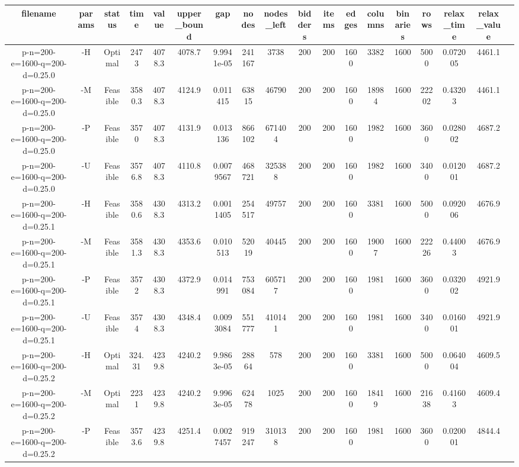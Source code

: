 \documentclass[landscape, a4paper]{article}
\begin{document}
\begin{center}
\begin{tabular}{@{}cccccccccccccccccc@{}}
filename & params & status & time & value & upper\_bound & gap & nodes & nodes\_left & bidders & items & edges & columns & binaries & rows & relax\_time & relax\_value & \\
\hline
p-n=200-e=1600-q=200-d=0.25.0 & -H & Optimal & 2473 & 4078.3 & 4078.7 & 9.9941e-05 & 241167 & 3738 & 200 & 200 & 1600 & 3382 & 1600 & 5000 & 0.072005 & 4461.1 & \\
p-n=200-e=1600-q=200-d=0.25.0 & -M & Feasible & 3580.3 & 4078.3 & 4124.9 & 0.011415 & 63815 & 46790 & 200 & 200 & 1600 & 18984 & 1600 & 22202 & 0.43203 & 4461.1 & \\
p-n=200-e=1600-q=200-d=0.25.0 & -P & Feasible & 3570 & 4078.3 & 4131.9 & 0.013136 & 866102 & 671404 & 200 & 200 & 1600 & 1982 & 1600 & 3600 & 0.028002 & 4687.2 & \\
p-n=200-e=1600-q=200-d=0.25.0 & -U & Feasible & 3576.8 & 4078.3 & 4110.8 & 0.0079567 & 468721 & 325388 & 200 & 200 & 1600 & 1982 & 1600 & 3400 & 0.012001 & 4687.2 & \\
p-n=200-e=1600-q=200-d=0.25.1 & -H & Feasible & 3580.6 & 4308.3 & 4313.2 & 0.0011405 & 254517 & 49757 & 200 & 200 & 1600 & 3381 & 1600 & 5000 & 0.092006 & 4676.9 & \\
p-n=200-e=1600-q=200-d=0.25.1 & -M & Feasible & 3581.3 & 4308.3 & 4353.6 & 0.010513 & 52019 & 40445 & 200 & 200 & 1600 & 19007 & 1600 & 22226 & 0.44003 & 4676.9 & \\
p-n=200-e=1600-q=200-d=0.25.1 & -P & Feasible & 3572 & 4308.3 & 4372.9 & 0.014991 & 753084 & 605717 & 200 & 200 & 1600 & 1981 & 1600 & 3600 & 0.032002 & 4921.9 & \\
p-n=200-e=1600-q=200-d=0.25.1 & -U & Feasible & 3574 & 4308.3 & 4348.4 & 0.0093084 & 551777 & 410141 & 200 & 200 & 1600 & 1981 & 1600 & 3400 & 0.016001 & 4921.9 & \\
p-n=200-e=1600-q=200-d=0.25.2 & -H & Optimal & 324.31 & 4239.8 & 4240.2 & 9.9863e-05 & 28864 & 578 & 200 & 200 & 1600 & 3381 & 1600 & 5000 & 0.064004 & 4609.5 & \\
p-n=200-e=1600-q=200-d=0.25.2 & -M & Optimal & 2231 & 4239.8 & 4240.2 & 9.9963e-05 & 62478 & 1025 & 200 & 200 & 1600 & 18419 & 1600 & 21638 & 0.41603 & 4609.4 & \\
p-n=200-e=1600-q=200-d=0.25.2 & -P & Feasible & 3573.6 & 4239.8 & 4251.4 & 0.0027457 & 919247 & 310138 & 200 & 200 & 1600 & 1981 & 1600 & 3600 & 0.020001 & 4844.4 & \\

\end{tabular}
\end{center}
\end{document}
